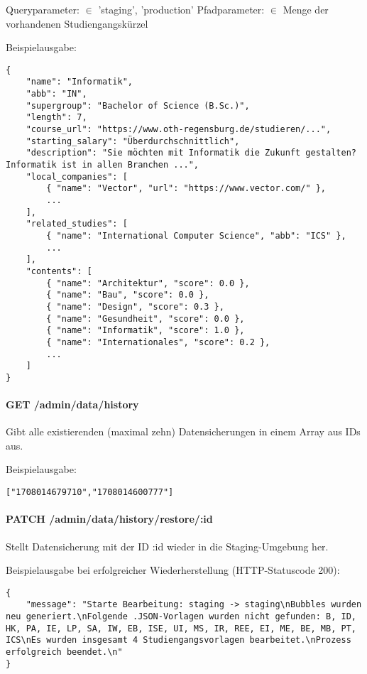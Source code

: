 \noindent
Queryparameter:  $\in$ {'staging', 'production'}\newline
Pfadparameter:  $\in$ Menge der vorhandenen Studiengangskürzel

\noindent
Beispielausgabe:

\begin{lstlisting}[style=Python]
{
    "name": "Informatik",
    "abb": "IN",
    "supergroup": "Bachelor of Science (B.Sc.)",
    "length": 7,
    "course_url": "https://www.oth-regensburg.de/studieren/...",
    "starting_salary": "Überdurchschnittlich",
    "description": "Sie möchten mit Informatik die Zukunft gestalten? Informatik ist in allen Branchen ...",
    "local_companies": [
        { "name": "Vector", "url": "https://www.vector.com/" },
        ...
    ],
    "related_studies": [
        { "name": "International Computer Science", "abb": "ICS" },
        ...
    ],
    "contents": [
        { "name": "Architektur", "score": 0.0 },
        { "name": "Bau", "score": 0.0 },
        { "name": "Design", "score": 0.3 },
        { "name": "Gesundheit", "score": 0.0 },
        { "name": "Informatik", "score": 1.0 },
        { "name": "Internationales", "score": 0.2 },
        ...
    ]
}
\end{lstlisting}

\paragraph*{GET /admin/data/history}
\vspace{-1.0em}
Gibt alle existierenden (maximal zehn) Datensicherungen in einem Array aus IDs aus.

\noindent
\begin{minipage}{\linewidth}
Beispielausgabe:
\begin{lstlisting}[style=Python]
    ["1708014679710","1708014600777"]
\end{lstlisting}
\end{minipage}

\paragraph*{PATCH /admin/data/history/restore/:id}
\vspace{-1.0em}
Stellt Datensicherung mit der ID :id wieder in die Staging-Umgebung her.

\noindent
Beispielausgabe bei erfolgreicher Wiederherstellung (HTTP-Statuscode 200):
\begin{lstlisting}[style=Python]
{
    "message": "Starte Bearbeitung: staging -> staging\nBubbles wurden neu generiert.\nFolgende .JSON-Vorlagen wurden nicht gefunden: B, ID, HK, PA, IE, LP, SA, IW, EB, ISE, UI, MS, IR, REE, EI, ME, BE, MB, PT, ICS\nEs wurden insgesamt 4 Studiengangsvorlagen bearbeitet.\nProzess erfolgreich beendet.\n"
}
\end{lstlisting}

